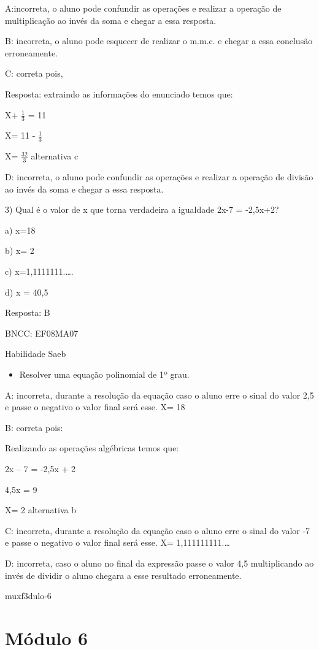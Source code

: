 {A:incorreta, o aluno pode confundir as operações e realizar a operação
de multiplicação ao invés da soma e chegar a essa resposta.

B: incorreta, o aluno pode esquecer de realizar o m.m.c. e chegar a essa
conclusão erroneamente.

C: correta pois,

Resposta: extraindo as informações do enunciado temos que:

X+ \(\frac{1}{3}\) = 11

X= 11 - \(\frac{1}{3}\)

X= \(\frac{32}{3}\) alternativa c

D: incorreta, o aluno pode confundir as operações e realizar a operação
de divisão ao invés da soma e chegar a essa resposta.

3) Qual é o valor de x que torna verdadeira a igualdade 2x-7 = -2,5x+2?

a) x=18

b) x= 2

c) x=1,1111111.\ldots.

d) x = 40,5

Resposta: B

BNCC: EF08MA07

Habilidade Saeb

\begin{itemize}
\tightlist
\item
  Resolver uma equação polinomial de 1º grau.
\end{itemize}

A: incorreta, durante a resolução da equação caso o aluno erre o sinal
do valor 2,5 e passe o negativo o valor final será esse. X= 18

B: correta pois:

Realizando as operações algébricas temos que:

2x -- 7 = -2,5x + 2

4,5x = 9

X= 2 alternativa b

C: incorreta, durante a resolução da equação caso o aluno erre o sinal
do valor -7 e passe o negativo o valor final será esse. X=
1,111111111.\ldots{}

D: incorreta, caso o aluno no final da expressão passe o valor 4,5
multiplicando ao invés de dividir o aluno chegara a esse resultado
erroneamente.

muxf3dulo-6}{%
\section{Módulo 6}

}
